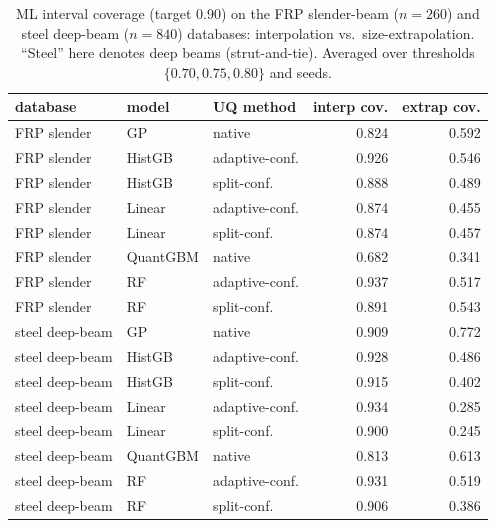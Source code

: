 \documentclass[11pt]{article}
\begin{document}
\begin{table}[h]\centering\small
\caption{ML interval coverage (target 0.90) on the FRP slender-beam ($n=260$) and steel deep-beam ($n=840$) databases: interpolation vs.\ size-extrapolation. ``Steel'' here denotes deep beams (strut-and-tie). Averaged over thresholds $\{0.70,0.75,0.80\}$ and seeds.}\label{tab:s3b}
\begin{tabular}{lllrr}
\toprule
\textbf{database} & \textbf{model} & \textbf{UQ method} & \textbf{interp cov.} & \textbf{extrap cov.} \\
\midrule
FRP slender & GP & native & 0.824 & 0.592 \\
FRP slender & HistGB & adaptive-conf. & 0.926 & 0.546 \\
FRP slender & HistGB & split-conf. & 0.888 & 0.489 \\
FRP slender & Linear & adaptive-conf. & 0.874 & 0.455 \\
FRP slender & Linear & split-conf. & 0.874 & 0.457 \\
FRP slender & QuantGBM & native & 0.682 & 0.341 \\
FRP slender & RF & adaptive-conf. & 0.937 & 0.517 \\
FRP slender & RF & split-conf. & 0.891 & 0.543 \\
steel deep-beam & GP & native & 0.909 & 0.772 \\
steel deep-beam & HistGB & adaptive-conf. & 0.928 & 0.486 \\
steel deep-beam & HistGB & split-conf. & 0.915 & 0.402 \\
steel deep-beam & Linear & adaptive-conf. & 0.934 & 0.285 \\
steel deep-beam & Linear & split-conf. & 0.900 & 0.245 \\
steel deep-beam & QuantGBM & native & 0.813 & 0.613 \\
steel deep-beam & RF & adaptive-conf. & 0.931 & 0.519 \\
steel deep-beam & RF & split-conf. & 0.906 & 0.386 \\
\bottomrule
\end{tabular}
\end{table}
\end{document}

